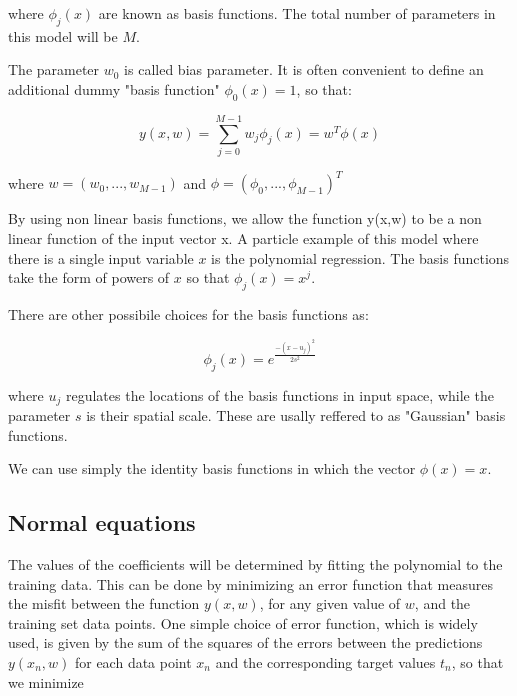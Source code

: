 where $\phi_j(x)$ are known as basis functions. The total number of parameters in this model will be $M$.

The parameter $w_0$ is called bias parameter. It is often convenient to define an additional dummy "basis function" $\phi_0(x)=1$, so that:

\begin{Equation}[!h]
	\centering
	\begin{equation}
	y(x,w)=\sum_{j=0}^{M-1}w_j \phi_j(x) = w^T\phi(x)
	\end{equation}
	\label{eq:mathmodela}
\end{Equation}

where $w=(w_0,...,w_{M-1})$ and $\phi=(\phi_0,...,\phi_{M-1})^T$

By using non linear basis functions, we allow the function y(x,w) to be a non linear function of the input vector x.  A particle example of this model where there is a single input variable $x$ is the polynomial regression. The basis functions take the form of powers of $x$ so that $\phi_j(x)=x^j$.

There are other possibile choices for the basis functions as:

\begin{Equation}[!h]
	\centering
	\begin{equation}
		\phi_j(x)=e^{\frac{-(x-u_j)^2}{2s^2}}
	\end{equation}
	\label{eq:mathmodela}
\end{Equation}

where $u_j$ regulates the locations of the basis functions in input space, while the parameter $s$ is their spatial scale. These are usally reffered to as "Gaussian" basis functions. 

We can use simply the identity basis functions in which the vector $\phi(x)=x$.

\subsection{Normal equations}
\label{subsec:reglinmulnormeq}
The values of the coefficients will be determined by fitting the polynomial to the training data. This can be done by minimizing an error function that measures the misfit between the function $y(x, w)$, for any given value of $w$, and the training set data points. One simple choice of error function, which is widely used, is given by the sum of the squares of the errors between the predictions $y(x_n, w)$ for each data
point $x_n$ and the corresponding target values $t_n$, so that we minimize

